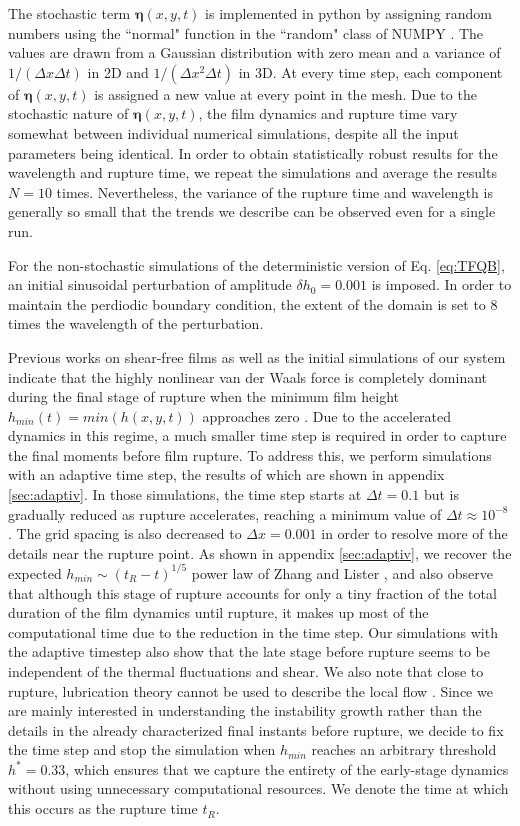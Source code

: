 \documentclass[
 onecolumn,
 amsmath,amssymb,
floatfix,superscriptaddress
]{revtex4-2}
\begin{document}
The stochastic term $\boldsymbol{\eta}(x,y,t)$ is implemented in python by assigning random numbers using the ``normal" function in the ``random" class of  NUMPY \cite{OliphantNumpy2006}. The values are drawn from a Gaussian distribution with zero mean and a variance of $1/(\Delta x \Delta t)$ in 2D and $1/(\Delta x^2 \Delta t)$ in 3D. At every time step, each component of $\boldsymbol{\eta}(x,y,t)$ is assigned a new value at every point in the mesh. Due to the stochastic nature of $\boldsymbol{\eta}(x,y,t)$, the film dynamics and rupture time vary somewhat between individual numerical simulations, despite all the input parameters being identical. In order to obtain statistically robust results for the wavelength and rupture time, we repeat the simulations and average the results $N=10$ times. Nevertheless, the variance of the rupture time and wavelength is generally so small that the trends we describe can be observed even for a single run.

For the non-stochastic simulations of the deterministic version of Eq. \ref{eq:TFQB}, an initial sinusoidal perturbation of amplitude $\delta h_0=0.001$ is imposed. In order to maintain the perdiodic boundary condition, the extent of the domain is set to 8 times the wavelength of the perturbation.

Previous works on shear-free films as well as the initial simulations of our system indicate that the highly nonlinear van der Waals force is completely dominant during the final stage of rupture when the minimum film height $h_{min}(t) = min(h(x,y,t))$ approaches zero \cite{ZhangLister1999, Zhaosprittles2022}. Due to the accelerated dynamics in this regime, a much smaller time step is required in order to capture the final moments before film rupture. To address this, we perform simulations with an adaptive time step, the results of which are shown in appendix \ref{sec:adaptiv}. In those simulations, the time step starts at $\Delta t = 0.1$  but is gradually reduced as rupture accelerates, reaching a minimum value of $\Delta t \approx 10^{-8} $. The grid spacing is also decreased to $\Delta x=0.001$ in order to resolve more of the details near the rupture point. As shown in appendix \ref{sec:adaptiv}, we recover the expected $h_{min}\sim (t_R-t)^{1/5}$ power law of Zhang and Lister \cite{ZhangLister1999}, and also observe that although this stage of rupture accounts for only a tiny fraction of the total duration of the film dynamics until rupture, it makes up most of the computational time due to the reduction in the time step. Our simulations with the adaptive timestep also show that the late stage before rupture seems to be independent of the thermal fluctuations and shear. We also note that close to rupture, lubrication theory cannot be used to describe the local flow \cite{morenoBozaMartinezCalvoSevilla2020}. Since we are mainly interested in understanding the instability growth rather than the details in the already characterized final instants before rupture, we decide to fix the time step and stop the simulation when $h_{min}$ reaches an arbitrary threshold $h^*=0.33$, which ensures that we capture the entirety of the early-stage dynamics without using unnecessary computational resources. We denote the time at which this occurs as the rupture time $t_R$.
\end{document}
